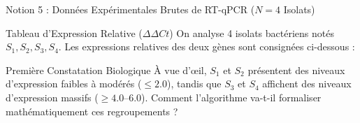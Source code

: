 \documentclass[aspectratio=169,10pt]{beamer}
\begin{document}
\begin{frame}{Notion 5 : Données Expérimentales Brutes de RT-qPCR ($N = 4$ Isolats)}
  \begin{conceptbox}{Tableau d'Expression Relative ($\Delta\Delta Ct$)}
    \footnotesize
    On analyse 4 isolats bactériens notés $S_1, S_2, S_3, S_4$. Les expressions relatives des deux gènes sont consignées ci-dessous :
    \begin{center}
    \end{center}
  \end{conceptbox}
  \vspace{1mm}
  \begin{biobox}{Première Constatation Biologique}
    \footnotesize
    À vue d'œil, $S_1$ et $S_2$ présentent des niveaux d'expression faibles à modérés ($\le 2.0$), tandis que $S_3$ et $S_4$ affichent des niveaux d'expression massifs ($\ge 4.0\text{--}6.0$). Comment l'algorithme va-t-il formaliser mathématiquement ces regroupements ?
  \end{biobox}
\end{frame}
\end{document}
